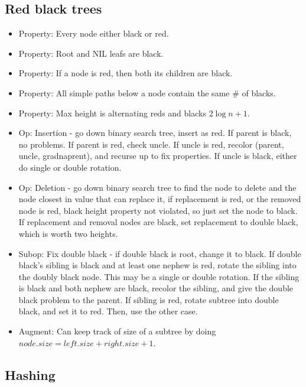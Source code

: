 \subsection{Red black trees}
\begin{itemize}
    \item Property: Every node either black or red.
    \item Property: Root and NIL leafs are black.
    \item Property: If a node is red, then both its children are black.
    \item Property: All simple paths below a node contain the same \# of blacks.
    \item Property: Max height is alternating reds and blacks $2\log n + 1$.
    \item Op: Insertion - go down binary search tree, insert as red. If parent is black, no problems. If parent is red, check uncle. If uncle is red, recolor (parent, uncle, gradnaprent), and recurse up to fix properties. If uncle is black, either do single or double rotation.
    \item Op: Deletion - go down binary search tree to find the node to delete and the node closest in value that can replace it, if replacement is red, or the removed node is red, black height property not violated, so just set the node to black. If replacement and removal nodes are black, set replacement to double black, which is worth two heights.
    \item Subop: Fix double black - if double black is root, change it to black. If double black's sibling is black and at least one nephew is red, rotate the sibling into the doubly black node. This may be a single or double rotation. If the sibling is black and both nephew are black, recolor the sibling, and give the double black problem to the parent. If sibling is red, rotate subtree into double black, and set it to red. Then, use the other case.
    \item Augment: Can keep track of size of a subtree by doing $node.size = left.size + right.size + 1$.
\end{itemize}
\subsection{Hashing}
